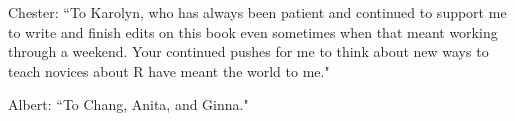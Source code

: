 
\cleardoublepage\newpage
\thispagestyle{empty}

\begin{center}
Chester: ``To Karolyn, who has always been patient and continued to support me to write and finish edits on this book even sometimes when that meant working through a weekend.  Your continued pushes for me to think about new ways to teach novices about R have meant the world to me."

Albert: ``To Chang, Anita, and Ginna."
\end{center}

\setlength{\abovedisplayskip}{-5pt}
\setlength{\abovedisplayshortskip}{-5pt}
